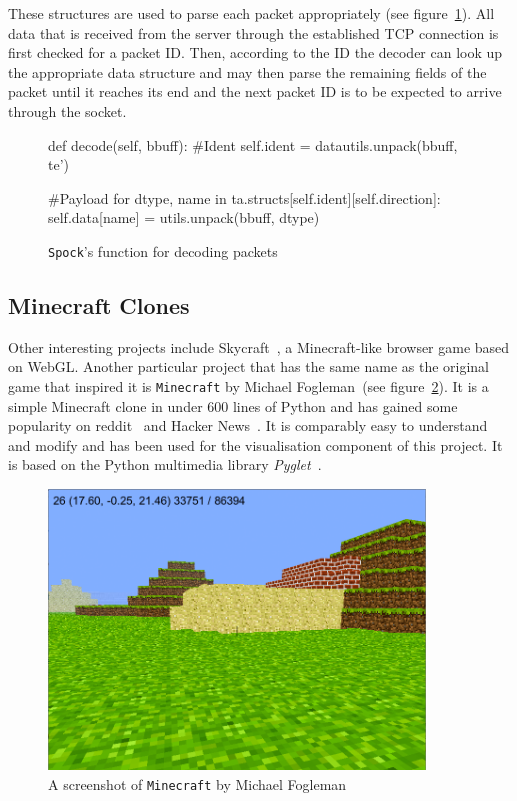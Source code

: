 These structures are used to parse each packet appropriately (see figure~\ref{snippet_parse}). All data that is received from the server through the established TCP connection is first checked for a packet ID. Then, according to the ID the decoder can look up the appropriate data structure and may then parse the remaining fields of the packet until it reaches its end and the next packet ID is to be expected to arrive through the socket.
		\begin{figure}[ht]
			\centering
			\begin{minipage}{13cm}
				\begin{pseudocode}
def decode(self, bbuff):
	#Ident
	self.ident = datautils.unpack(bbuff, te')
	
	#Payload
	for dtype, name in ta.structs[self.ident][self.direction]:
		self.data[name] = utils.unpack(bbuff, dtype)
					\end{pseudocode}
				\caption{\texttt{Spock}'s function for decoding packets}
				\label{snippet_parse}
			\end{minipage}
		\end{figure}
		
		\subsection{Minecraft Clones}
Other interesting projects include Skycraft~\cite{skycraft}, a Minecraft-like browser game based on WebGL. Another particular project that has the same name as the original game that inspired it is \texttt{Minecraft} by Michael Fogleman~(see figure~\ref{fogleman_mc_screen}). It is a simple Minecraft clone in under 600 lines of Python and has gained some popularity on reddit~\cite{fogle-reddit} and Hacker News~\cite{fogle_hn}. It is comparably easy to understand and modify and has been used for the visualisation component of this project. It is based on the Python multimedia library \emph{Pyglet}~\cite{pyglet}.

\begin{figure}[h]
  \centering
    \includegraphics[width=10cm]{graphics/fogleman_mc_screen}
  \caption{A screenshot of \texttt{Minecraft} by Michael Fogleman}
  \label{fogleman_mc_screen}
\end{figure}

